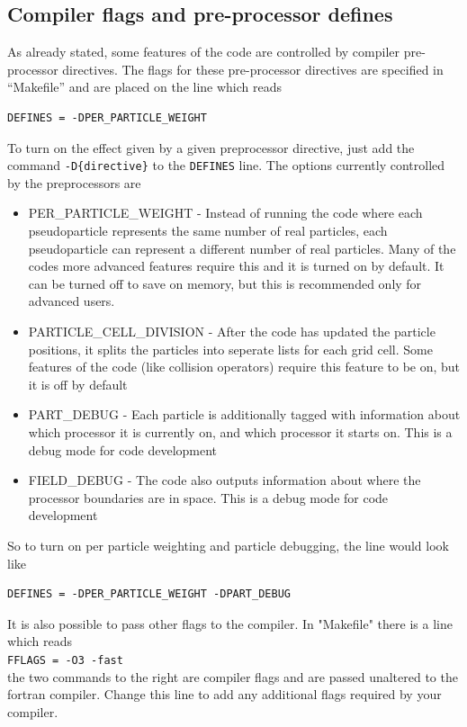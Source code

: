 \documentclass[12pt]{article}
\begin{document}
\subsection{Compiler flags and pre-processor defines}
As already stated, some features of the code are controlled by compiler pre-processor directives. The flags for these pre-processor directives are specified in ``Makefile'' and are placed on the line which reads\\
\begin{verbatim}
DEFINES = -DPER_PARTICLE_WEIGHT
\end{verbatim}
To turn on the effect given by a given preprocessor directive, just add the command \texttt{-D\{directive\}} to the \texttt{DEFINES} line. The options currently controlled by the preprocessors are\\
\begin{itemize}
\item PER\_PARTICLE\_WEIGHT - Instead of running the code where each pseudoparticle represents the same number of real particles, each pseudoparticle can represent a different number of real particles. Many of the codes more advanced features require this and it is turned on by default. It can be turned off to save on memory, but this is recommended only for advanced users.
\item PARTICLE\_CELL\_DIVISION - After the code has updated the particle positions, it splits the particles into seperate lists for each grid cell. Some features of the code (like collision operators) require this feature to be on, but it is off by default
\item PART\_DEBUG - Each particle is additionally tagged with information about which processor it is currently on, and which processor it starts on. This is a debug mode for code development
\item FIELD\_DEBUG - The code also outputs information about where the processor boundaries are in space. This is a debug mode for code development
\end{itemize}

So to turn on per particle weighting and particle debugging, the line would look like\\
\begin{verbatim}
DEFINES = -DPER_PARTICLE_WEIGHT -DPART_DEBUG
\end{verbatim}

It is also possible to pass other flags to the compiler. In "Makefile" there is a line which reads\\
\texttt{FFLAGS = -O3 -fast}\\
the two commands to the right are compiler flags and are passed unaltered to the fortran compiler. Change this line to add any additional flags required by your compiler.
\end{document}
